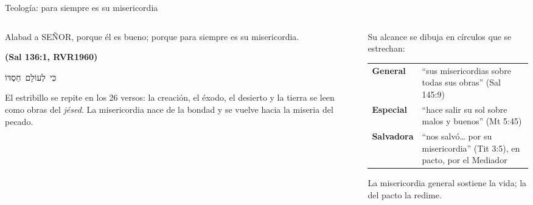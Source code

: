 \documentclass[hyperref={bookmarks=false},aspectratio=169]{beamer}
\newcommand{\heb}[1]{\mbox{\foreignlanguage{hebrew}{#1}}}
\newcommand{\SENOR}{S{\fontsize{0.78em}{1em}\selectfont EÑOR}}
\newcommand{\fuente}[1]{\par\hfill{\upshape\bfseries\footnotesize\textcolor{azul}{#1}}}
\newcommand{\destacar}[1]{\textbf{\textcolor{azul}{#1}}}
\begin{document}
\begin{frame}{Teología: para siempre es su misericordia}
\begin{columns}[t,onlytextwidth]
\begin{column}{0.46\textwidth}
\begin{cita}Alabad a \SENOR, porque él es bueno; porque para siempre es su misericordia.\fuente{(Sal 136:1, RVR1960)}\end{cita}
\begin{center}\heb{כִּי לְעוֹלָם חַסְדּוֹ}\end{center}
\scriptsize El estribillo se repite en los 26 versos: la creación, el éxodo, el desierto y la tierra se leen como obras del \emph{jésed}. La misericordia nace de la bondad y se vuelve hacia la miseria del pecado.
\end{column}
\begin{column}{0.52\textwidth}\small
Su alcance se dibuja en círculos que se estrechan:\par\smallskip
\renewcommand{\arraystretch}{1.15}\footnotesize
\begin{tabular}{@{}>{\RaggedRight\arraybackslash}p{1.6cm}>{\RaggedRight\arraybackslash}p{4.6cm}@{}}
\toprule
\destacar{General} & ``sus misericordias sobre todas sus obras'' (Sal 145:9) \\
\destacar{Especial} & ``hace salir su sol sobre malos y buenos'' (Mt 5:45) \\
\destacar{Salvadora} & ``nos salvó\ldots{} por su misericordia'' (Tit 3:5), en pacto, por el Mediador \\
\bottomrule
\end{tabular}\par\medskip
\small La misericordia general sostiene la vida; la del pacto la redime.
\end{column}
\end{columns}
\end{frame}
\end{document}
